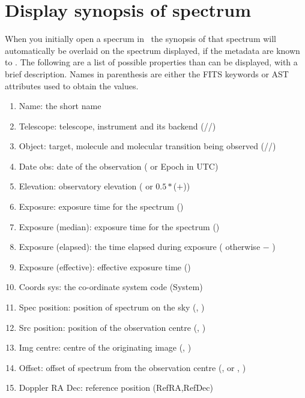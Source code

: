 \documentclass[11pt,oneside,chapters]{starlink}
\providecommand{\att}[1]{\textsf{#1}}
\begin{document}
\section{Display synopsis of spectrum}
\label{sec:splat-synopsis}

When you initially open a specrum in \splat\ the synopsis of that spectrum
will automatically be overlaid on the spectrum displayed, if the metadata are
known to \splat. The following are a list of possible properties
than can be displayed, with a brief description. Names in parenthesis
are either the FITS keywords or AST attributes used to obtain the values.

\begin{enumerate}
\item  Name: the short name
\item  Telescope: telescope, instrument and its backend
       (//)
\item  Object: target, molecule and molecular transition being
       observed (//)
\item  Date obs: date of the observation ( or \att{Epoch} in UTC)
\item  Elevation: observatory elevation ( or
       $0.5 * $($+$))
\item  Exposure: exposure time for the spectrum ()
\item  Exposure (median): exposure time for the spectrum ()
\item  Exposure (elapsed): the time elapsed during exposure (
       otherwise  $-$ )
\item  Exposure (effective): effective exposure time ()
\item  Coords sys: the co-ordinate system code (\att{System})
\item  Spec position: position of spectrum on the sky (, )
\item  Src position: position of the observation centre (, )
\item  Img centre: centre of the originating image (, )
\item  Offset: offset of spectrum from the observation centre
       (,  or , )
\item  Doppler RA Dec: reference position (\att{RefRA},\att{RefDec})

\end{enumerate}
\end{document}
